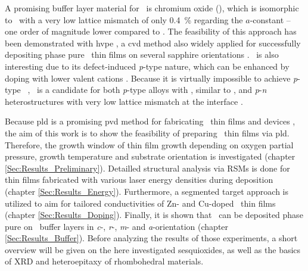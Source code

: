 A promising buffer layer material for \agao\ is chromium oxide (\cro), which is isomorphic to \agao\ with a very low lattice mismatch of only \qty{0.4}{\percent} regarding the $a$-constant -- one order of magnitude lower compared to \alo.
The feasibility of this approach has been demonstrated with \acrfull{hvpe}
    \cite{stepanov2021,polyakov2022,polyakov2022a,butenko2023},
a \acrfull{cvd} method also widely applied for successfully depositing phase pure \agao\ thin films on several sapphire orientations
    \cite{jinno2020}.
\cro\ is also interesting due to its defect-induced \textit{p}-type nature, which can be enhanced by doping with lower valent cations
    \cite{arca2011,arca2013,arca2017,farrell2015}.
Because it is virtually impossible to achieve \textit{p}-type \gao\
    \cite{pearton2018},
\cro\ is a candidate for both \textit{p}-type alloys with \agao, similar to 
    \cite{kaneko2021},
and \textit{p}-\textit{n} heterostructures with very low lattice mismatch at the interface
    \cite{polyakov2022a}.

Because \acrfull{pld} is a promising \acrfull{pvd} method for fabricating \agao\ thin films and devices
    \cite{petersen2023,vogt2023,vogt2024},
the aim of this work is to show the feasibility of preparing \cro\ thin films via \acrshort{pld}.
Therefore, the growth window of thin film growth depending on oxygen partial pressure, growth temperature and substrate orientation is investigated (chapter \ref{Sec:Results_Preliminary}).
Detailled structural analysis via \glspl{RSM} is done for thin films fabricated with various laser energy densities during deposition (chapter \ref{Sec:Results_Energy}).
Furthermore, a segmented target approach is utilized to aim for tailored conductivities of Zn- and Cu-doped \cro\ thin films (chapter \ref{Sec:Results_Doping}).
Finally, it is shown that \agao\ can be deposited phase pure on \cro\ buffer layers in \textit{c}-, \textit{r}-, \textit{m}- and \textit{a}-orientation (chapter \ref{Sec:Results_Buffer}).
Before analyzing the results of those experiments, a short overview will be given on the here investigated sesquioxides, as well as the basics of \acrfull{XRD} and heteroepitaxy of rhombohedral materials.